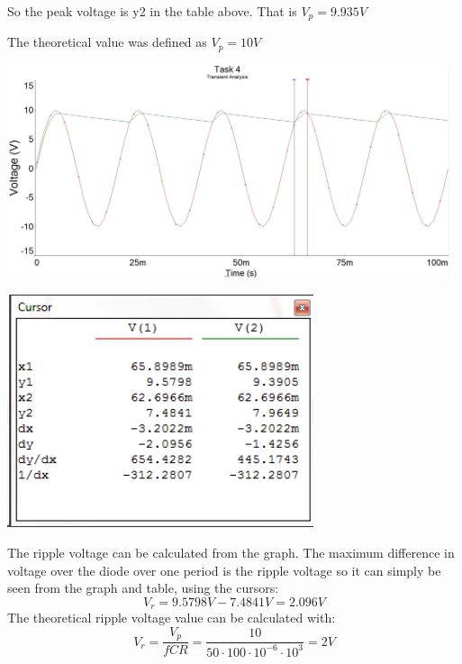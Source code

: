 \documentclass[11pt,a4paper]{article}
\begin{document}
\begin{enumerate}
\begin{enumerate}
    \vspace{2em}
        
    So the peak voltage is y2 in the table above. That is $V_p = 9.935 V$ 
    
    The theoretical value was defined as $V_p = 10 V$ \\
    
    \begin{minipage}{\linewidth}
    	\centering
        \includegraphics[width=13cm]{4_3.jpg}
    \end{minipage}
    
    \begin{minipage}{\linewidth}
    	\centering
        \includegraphics[width=9cm]{table_4_2.png}
    \end{minipage}
    
    \vspace{2em}
    
	The ripple voltage can be calculated from the graph. The maximum difference in voltage over the diode over one period is the ripple voltage so it can simply be seen from the graph and table, using the cursors: $$ V_r = 9.5798 V - 7.4841 V = 2.096 V$$
    The theoretical ripple voltage value can be calculated with: $$ V_r = \dfrac{V_p}{fCR} = \dfrac{10}{50 \cdot 100 \cdot 10^{-6} \cdot 10^3} = 2 V$$
    \vspace{2em}
  

\end{enumerate}
\end{enumerate}
\end{document}
